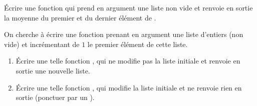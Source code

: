 \question{} \'Ecrire une fonction  qui prend en argument une liste  non vide et renvoie en sortie la moyenne du premier et du dernier élément de .

\question{}On cherche à écrire une fonction prenant en argument une liste d'entiers (non vide) et incrémentant de $1$ le premier élément de cette liste.
\begin{enumerate}[label=\emph{\alph*)}]
  \item \'Ecrire une telle fonction , qui ne modifie pas la liste initiale et renvoie en sortie une nouvelle liste.
  \item \'Ecrire une telle fonction , qui modifie la liste initiale et ne renvoie rien en sortie (ponctuer par un ).
\end{enumerate}
